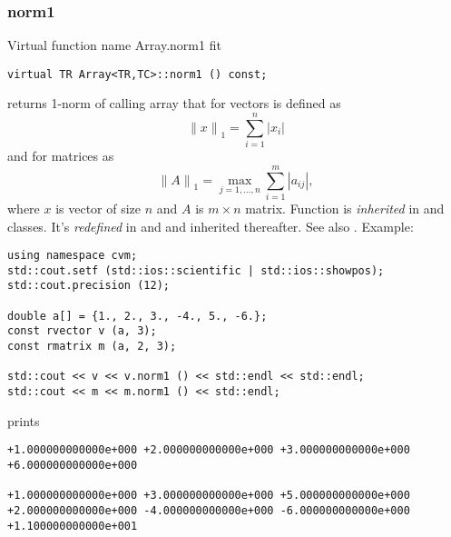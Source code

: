 \subsubsection{norm1}
Virtual function%
\pdfdest name {Array.norm1} fit
\begin{verbatim}
virtual TR Array<TR,TC>::norm1 () const;
\end{verbatim}
returns 1-norm of calling array that for vectors
is defined as
\begin{equation*}
{\|x\|}_1=\sum_{i=1}^{n} |x_i|
\end{equation*}
and for matrices as
\begin{equation*}
{\|A\|}_{1}=\max_{j=1,\dots,n} \sum_{i=1}^{m} |a_{ij}|,
\end{equation*}
where $x$ is  vector of size $n$ and $A$ is  $m\times n$ matrix.
Function is \emph{inherited} in
 and  classes.
It's \emph{redefined} in
 and 
and inherited thereafter.
See also .
Example:
\begin{Verbatim}
using namespace cvm;
std::cout.setf (std::ios::scientific | std::ios::showpos);
std::cout.precision (12);

double a[] = {1., 2., 3., -4., 5., -6.};
const rvector v (a, 3);
const rmatrix m (a, 2, 3);

std::cout << v << v.norm1 () << std::endl << std::endl;
std::cout << m << m.norm1 () << std::endl;
\end{Verbatim}
prints
\begin{Verbatim}
+1.000000000000e+000 +2.000000000000e+000 +3.000000000000e+000
+6.000000000000e+000

+1.000000000000e+000 +3.000000000000e+000 +5.000000000000e+000
+2.000000000000e+000 -4.000000000000e+000 -6.000000000000e+000
+1.100000000000e+001
\end{Verbatim}
\newpage




